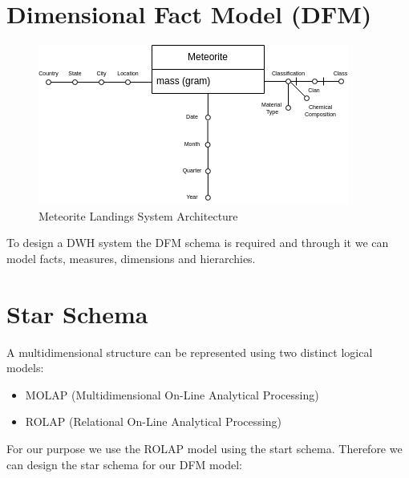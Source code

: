 \documentclass[conference]{IEEEtran}
\begin{document}
	\section{Dimensional Fact Model (DFM)}
	\begin{figure}[htpb]
		\centering
		\includegraphics[width=\columnwidth]{images/dfm_schema.png}
		\caption{Meteorite Landings System Architecture}
		\label{fig:Meteorite Landings System Architecture}
	\end{figure}
	To design a DWH system the DFM schema is required and through it we can model facts, measures, dimensions and hierarchies. \\
	\section{Star Schema}
	A multidimensional structure can be represented using two distinct logical models:
	\begin{itemize}
		\item MOLAP (Multidimensional On-Line Analytical Processing)
		\item ROLAP (Relational On-Line Analytical Processing)
	\end{itemize}
	For our purpose we use the ROLAP model using the start schema. Therefore we can design the star schema for our DFM model:
	
\end{document}
